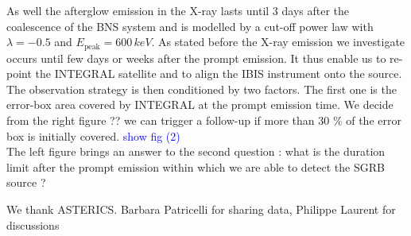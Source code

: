 \documentclass[a0,portrait]{a0poster}
\begin{document}
\begin{multicols}{2}

As well the afterglow emission in the X-ray lasts until 3 days after the coalescence of the BNS system and is modelled by a cut-off power law with $\lambda = - 0.5$ and $E_{\mathrm{peak}} = 600 \, keV$. As stated before the X-ray emission we investigate occurs until few days or weeks after the prompt emission. It thus enable us to re-point the INTEGRAL satellite and to align the IBIS instrument onto the source. The observation strategy is then conditioned by two factors. The first one is the error-box area covered by INTEGRAL at the prompt emission time. We decide from the right figure ?? we can trigger a follow-up if more than 30 \% of the error box is initially covered. \textcolor{blue}{show fig (2)} \\
The left figure brings an answer to the second question : what is the duration limit after the prompt emission within which we are able to detect the SGRB source ? 


\cite{*}


\vspace{10mm}

{\footnotesize 
  We thank ASTERICS. Barbara Patricelli for sharing data, Philippe Laurent for discussions}




\end{multicols}
\end{document}
